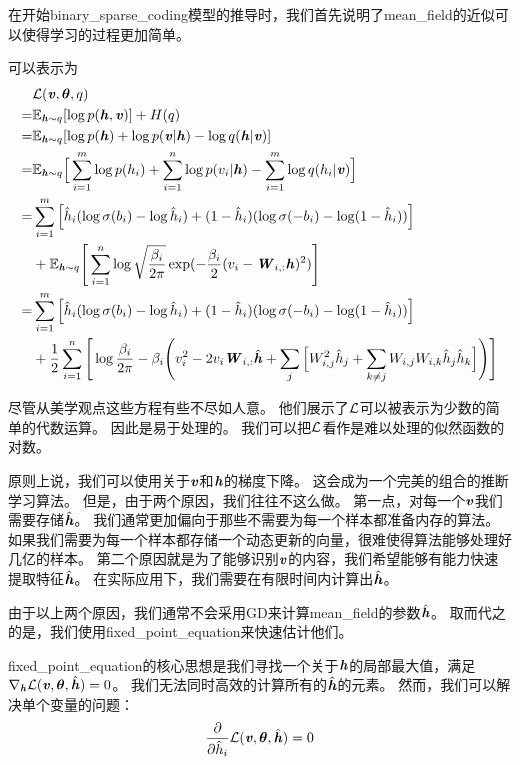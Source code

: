 在开始\gls{binary_sparse_coding}模型的推导时，我们首先说明了\gls{mean_field}的近似可以使得学习的过程更加简单。


可以表示为
\begin{align}
\label{eqn:1936}
& \mathcal{L}(\boldsymbol{\mathit{v}},\boldsymbol{\theta},q)\\
 = & \mathbb{E}_{\boldsymbol{\mathit{h}}\sim q}[\log p(\boldsymbol{\mathit{h}},\boldsymbol{\mathit{v}})] + H(q)\\
 = & \mathbb{E}_{\boldsymbol{\mathit{h}}\sim q}[\log p(\boldsymbol{\mathit{h}}) + \log p(\boldsymbol{\mathit{v}}\vert\boldsymbol{\mathit{h}}) - \log q(\boldsymbol{\mathit{h}}\vert\boldsymbol{\mathit{v}})]\\
= & \mathbb{E}_{\boldsymbol{\mathit{h}}\sim q}\Big[\sum_{i=1}^{m}\log p(h_i) + \sum_{i=1}^{n} \log p(v_i\vert\boldsymbol{\mathit{h}}) - \sum_{i=1}^{m}\log q(h_i\vert\boldsymbol{\mathit{v}})\Big]\\
= &  \sum_{i=1}^{m}\Big[\hat{h}_i(\log \sigma(b_i) - \log \hat{h}_i) + (1 - \hat{h}_i)(\log \sigma(-b_i) - \log (1-\hat{h}_i))\Big] \\
& +  \mathbb{E}_{\boldsymbol{\mathit{h}}\sim q} \Bigg[ \sum_{i=1}^{n}\log \sqrt{\frac{\beta_i}{2\pi}}\exp(-\frac{\beta_i}{2}(v_i - \boldsymbol{\mathit{W}}_{i,:}\boldsymbol{\mathit{h}})^2)\Bigg] \\
= &  \sum_{i=1}^{m}\Big[\hat{h}_i(\log \sigma(b_i) - \log \hat{h}_i) + (1 - \hat{h}_i)(\log \sigma(-b_i) - \log (1-\hat{h}_i))\Big] \\
& + \frac{1}{2} \sum_{i=1}^{n} \Bigg[ \log {\frac{\beta_i}{2\pi}} - \beta_i \Bigg(v_i^2 - 2 v_i \boldsymbol{\mathit{W}}_{i,:}\hat{\boldsymbol{\mathit{h}}} + \sum_{j}\Big[W^2_{i,j}\hat{h}_j + \sum_{k \neq j}W_{i,j}W_{i,k}\hat{h}_j\hat{h}_k \Big] \Bigg) \Bigg] 
\end{align}


尽管从美学观点这些方程有些不尽如人意。
他们展示了$\mathcal{L}$可以被表示为少数的简单的代数运算。
因此是易于处理的。
我们可以把$\mathcal{L}$看作是难以处理的似然函数的对数。


原则上说，我们可以使用关于$\boldsymbol{\mathit{v}}$和$\boldsymbol{\mathit{h}}$的梯度下降。
这会成为一个完美的组合的推断学习算法。
但是，由于两个原因，我们往往不这么做。
第一点，对每一个$\boldsymbol{\mathit{v}}$我们需要存储$\hat{\boldsymbol{\mathit{h}}}$。
我们通常更加偏向于那些不需要为每一个样本都准备内存的算法。
如果我们需要为每一个样本都存储一个动态更新的向量，很难使得算法能够处理好几亿的样本。
第二个原因就是为了能够识别$\boldsymbol{\mathit{v}}$的内容，我们希望能够有能力快速提取特征$\hat{\boldsymbol{\mathit{h}}}$。
在实际应用下，我们需要在有限时间内计算出$\hat{\boldsymbol{\mathit{h}}}$。


由于以上两个原因，我们通常不会采用\gls{GD}来计算\gls{mean_field}的参数$\hat{\boldsymbol{\mathit{h}}}$。
取而代之的是，我们使用\gls{fixed_point_equation}来快速估计他们。


\gls{fixed_point_equation}的核心思想是我们寻找一个关于$\boldsymbol{\mathit{h}}$的局部最大值，满足$\nabla_{\boldsymbol{\mathit{h}}}\mathcal{L}(\boldsymbol{\mathit{v}},\boldsymbol{\theta},\hat{\boldsymbol{\mathit{h}}}) = 0$。
我们无法同时高效的计算所有的$\hat{\boldsymbol{\mathit{h}}}$的元素。
然而，我们可以解决单个变量的问题：
\begin{align}
\label{eqn:1937}
\frac{\partial}{\partial \hat{h}_i} \mathcal{L}(\boldsymbol{\mathit{v}},\boldsymbol{\theta},\hat{\boldsymbol{\mathit{h}}}) = 0 
\end{align}



